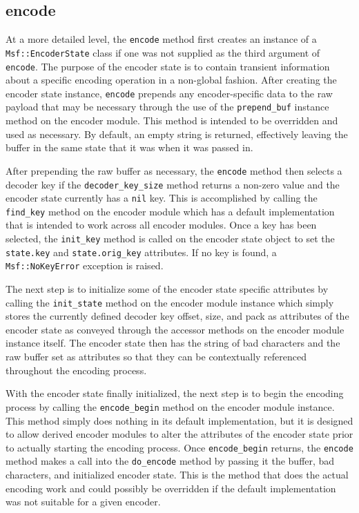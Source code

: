 \documentclass{report}
\begin{document}
        \subsection{encode}

\par
At a more detailed level, the \texttt{encode} method first creates
an instance of a \texttt{Msf::EncoderState} class if one was not
supplied as the third argument of \texttt{encode}.  The purpose of
the encoder state is to contain transient information about a
specific encoding operation in a non-global fashion.  After creating
the encoder state instance, \texttt{encode} prepends any
encoder-specific data to the raw payload that may be necessary
through the use of the \texttt{prepend\_buf} instance method on the
encoder module.  This method is intended to be overridden and used
as necessary.  By default, an empty string is returned, effectively
leaving the buffer in the same state that it was when it was passed
in.

\par
After prepending the raw buffer as necessary, the \texttt{encode}
method then selects a decoder key if the \texttt{decoder\_key\_size}
method returns a non-zero value and the encoder state currently has
a \texttt{nil} key.  This is accomplished by calling the
\texttt{find\_key} method on the encoder module which has a default
implementation that is intended to work across all encoder modules.
Once a key has been selected, the \texttt{init\_key} method is
called on the encoder state object to set the \texttt{state.key} and
\texttt{state.orig\_key} attributes.  If no key is found, a
\texttt{Msf::NoKeyError} exception is raised.

\par
The next step is to initialize some of the encoder state specific
attributes by calling the \texttt{init\_state} method on the encoder
module instance which simply stores the currently defined decoder
key offset, size, and pack as attributes of the encoder state as
conveyed through the accessor methods on the encoder module instance
itself.  The encoder state then has the string of bad characters and
the raw buffer set as attributes so that they can be contextually
referenced throughout the encoding process.

\par
With the encoder state finally initialized, the next step is to
begin the encoding process by calling the \texttt{encode\_begin}
method on the encoder module instance.  This method simply does
nothing in its default implementation, but it is designed to allow
derived encoder modules to alter the attributes of the encoder state
prior to actually starting the encoding process.  Once
\texttt{encode\_begin} returns, the \texttt{encode} method makes a
call into the \texttt{do\_encode} method by passing it the buffer,
bad characters, and initialized encoder state.  This is the method
that does the actual encoding work and could possibly be overridden
if the default implementation was not suitable for a given encoder.
\end{document}
